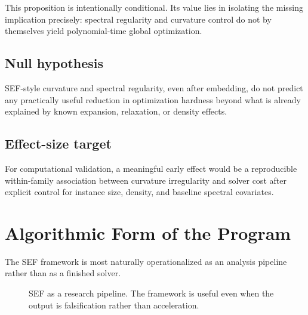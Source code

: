 \documentclass{svjour3}
\begin{document}
This proposition is intentionally conditional. Its value lies in isolating the missing implication precisely: spectral regularity and curvature control do not by themselves yield polynomial-time global optimization.

\subsection*{Null hypothesis}
SEF-style curvature and spectral regularity, even after embedding, do not predict any practically useful reduction in optimization hardness beyond what is already explained by known expansion, relaxation, or density effects.

\subsection*{Effect-size target}
For computational validation, a meaningful early effect would be a reproducible within-family association between curvature irregularity and solver cost after explicit control for instance size, density, and baseline spectral covariates.

\section{Algorithmic Form of the Program}
The SEF framework is most naturally operationalized as an analysis pipeline rather than as a finished solver.

\begin{figure}[t]
\centering
{}
\caption{SEF as a research pipeline. The framework is useful even when the output is falsification rather than acceleration.}
\label{fig:sef-pipeline}
\end{figure}
\end{document}
